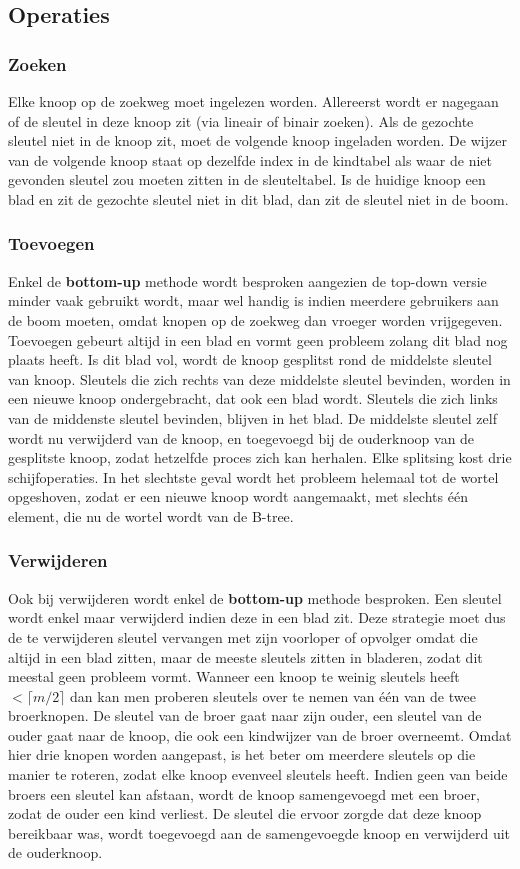 \documentclass{report}
\begin{document}
	\subsection{Operaties}
	\subsubsection{Zoeken}
	Elke knoop op de zoekweg moet ingelezen worden. Allereerst wordt er nagegaan of de sleutel in deze knoop zit (via lineair of binair zoeken). Als de gezochte sleutel niet in de knoop zit, moet de volgende knoop ingeladen worden. De wijzer van de volgende knoop staat op dezelfde index in de kindtabel als waar de niet gevonden sleutel zou moeten zitten in de sleuteltabel. Is de huidige knoop een blad en zit de gezochte sleutel niet in dit blad, dan zit de sleutel niet in de boom. 
	\subsubsection{Toevoegen}
	Enkel de \textbf{bottom-up} methode wordt besproken aangezien de top-down versie minder vaak gebruikt wordt, maar wel handig is indien meerdere gebruikers aan de boom moeten, omdat knopen op de zoekweg dan vroeger worden vrijgegeven. Toevoegen gebeurt altijd in een blad en vormt geen probleem zolang dit blad nog plaats heeft. Is dit blad vol, wordt de knoop gesplitst rond de middelste sleutel van knoop. Sleutels die zich rechts van deze middelste sleutel bevinden, worden in een nieuwe knoop ondergebracht, dat ook een blad wordt. Sleutels die zich links van de middenste sleutel bevinden, blijven in het blad. De middelste sleutel zelf wordt nu verwijderd van de knoop, en toegevoegd bij de ouderknoop van de gesplitste knoop, zodat hetzelfde proces zich kan herhalen. Elke splitsing kost drie schijfoperaties. In het slechtste geval wordt het probleem helemaal tot de wortel opgeshoven, zodat er een nieuwe knoop wordt aangemaakt, met slechts één element, die nu de wortel wordt van de B-tree.
	\subsubsection{Verwijderen}
	Ook bij verwijderen wordt enkel de \textbf{bottom-up} methode besproken. Een sleutel wordt enkel maar verwijderd indien deze in een blad zit. Deze strategie moet dus de te verwijderen sleutel vervangen met zijn voorloper of opvolger omdat die altijd in een blad zitten, maar de meeste sleutels zitten in bladeren, zodat dit meestal geen probleem vormt. Wanneer een knoop te weinig sleutels heeft $< \lceil m/2 \rceil$ dan kan men proberen sleutels over te nemen van één van de twee broerknopen. De sleutel van de broer gaat naar zijn ouder, een sleutel van de ouder gaat naar de knoop, die ook een kindwijzer van de broer overneemt. Omdat hier drie knopen worden aangepast, is het beter om meerdere sleutels op die manier te roteren, zodat elke knoop evenveel sleutels heeft. Indien geen van beide broers een sleutel kan afstaan, wordt de knoop samengevoegd met een broer, zodat de ouder een kind verliest. De sleutel die ervoor zorgde dat deze knoop bereikbaar was, wordt toegevoegd aan de samengevoegde knoop en verwijderd uit de ouderknoop.
\end{document}
